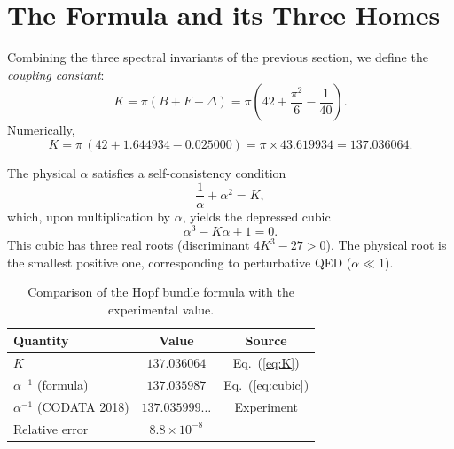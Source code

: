 %
\section{The Formula and its Three Homes}\label{sec:formula}

Combining the three spectral invariants of the previous section, we
define the \textit{coupling constant}:
\begin{equation}\label{eq:K}
  K = \pi\!\left(B + F - \Delta\right)
    = \pi\!\left(42 + \frac{\pi^2}{6} - \frac{1}{40}\right).
\end{equation}
Numerically,
\begin{equation}
  K = \pi\,(42 + 1.644934 - 0.025000)
    = \pi \times 43.619934
    = 137.036064.
\end{equation}

The physical $\alpha$ satisfies a self-consistency condition
\begin{equation}\label{eq:selfconsistent}
  \frac{1}{\alpha} + \alpha^2 = K,
\end{equation}
which, upon multiplication by $\alpha$, yields the depressed cubic
\begin{equation}\label{eq:cubic}
  \boxed{\alpha^3 - K\alpha + 1 = 0.}
\end{equation}
This cubic has three real roots (discriminant $4K^3 - 27 > 0$). The
physical root is the smallest positive one, corresponding to
perturbative QED ($\alpha \ll 1$).

\begin{table}[h]
\centering
\begin{tabular}{lcc}
\hline\hline
Quantity & Value & Source \\
\hline
$K$ & $137.036064$ & Eq.~(\ref{eq:K}) \\
$\alpha^{-1}$ (formula) & $137.035987$ & Eq.~(\ref{eq:cubic}) \\
$\alpha^{-1}$ (CODATA 2018) & $137.035999\ldots$ & Experiment \\
\hline
Relative error & $8.8 \times 10^{-8}$ & \\
\hline\hline
\end{tabular}
\caption{Comparison of the Hopf bundle formula with the experimental
value.}
\label{tab:comparison}
\end{table}

